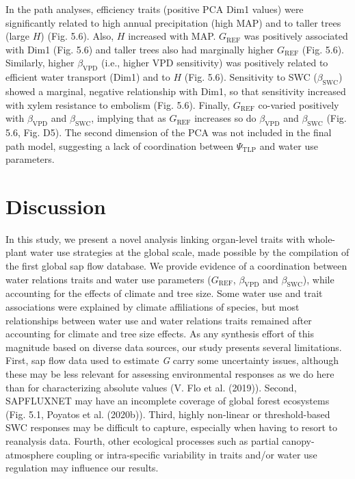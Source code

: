 \documentclass[11pt,twoside]{reedthesis}
\begin{document}
In the path analyses, efficiency traits (positive PCA Dim1 values) were
significantly related to high annual precipitation (high MAP) and to
taller trees (large \(H\)) (Fig. 5.6). Also, \(H\) increased with MAP.
\(G_{\text{REF}}\) was positively associated with Dim1 (Fig. 5.6) and
taller trees also had marginally higher \(G_{\text{REF}}\) (Fig. 5.6).
Similarly, higher \(\beta_{\text{VPD}}\) (i.e., higher VPD sensitivity)
was positively related to efficient water transport (Dim1) and to \(H\)
(Fig. 5.6). Sensitivity to SWC (\(\beta_{\text{SWC}}\)) showed a
marginal, negative relationship with Dim1, so that sensitivity increased
with xylem resistance to embolism (Fig. 5.6). Finally,
\(G_{\text{REF}}\) co-varied positively with \(\beta_{\text{VPD}}\) and
\(\beta_{\text{SWC}}\), implying that as \(G_{\text{REF}}\) increases so
do \(\beta_{\text{VPD}}\) and \(\beta_{\text{SWC}}\) (Fig. 5.6, Fig.
D5). The second dimension of the PCA was not included in the final path
model, suggesting a lack of coordination between \(\Psi_{\text{TLP}}\)
and water use parameters.\par

\section{Discussion}\label{discussion}

In this study, we present a novel analysis linking organ-level traits
with whole-plant water use strategies at the global scale, made possible
by the compilation of the first global sap flow database. We provide
evidence of a coordination between water relations traits and water use
parameters (\(G_{\text{REF}}\), \(\beta_{\text{VPD}}\) and
\(\beta_{\text{SWC}}\)), while accounting for the effects of climate and
tree size. Some water use and trait associations were explained by
climate affiliations of species, but most relationships between water
use and water relations traits remained after accounting for climate and
tree size effects. As any synthesis effort of this magnitude based on
diverse data sources, our study presents several limitations. First, sap
flow data used to estimate \emph{G} carry some uncertainty issues,
although these may be less relevant for assessing environmental
responses as we do here than for characterizing absolute values (V. Flo
et al. (2019)). Second, SAPFLUXNET may have an incomplete coverage of
global forest ecosystems (Fig. 5.1, Poyatos et al. (2020b)). Third,
highly non-linear or threshold-based SWC responses may be difficult to
capture, especially when having to resort to reanalysis data. Fourth,
other ecological processes such as partial canopy-atmosphere coupling or
intra-specific variability in traits and/or water use regulation may
influence our results.\par
\end{document}
